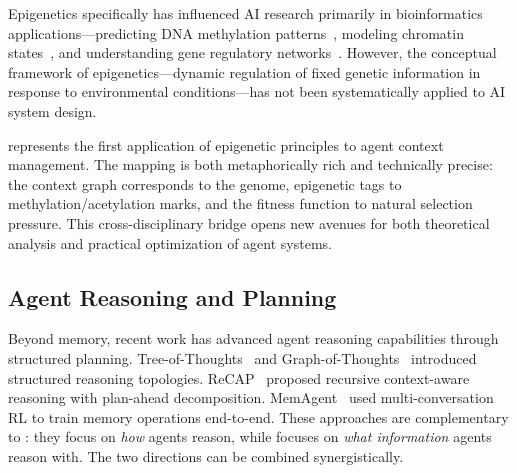 Epigenetics specifically has influenced AI research primarily in bioinformatics applications---predicting DNA methylation patterns~\citep{angermueller2017deepcpg}, modeling chromatin states~\citep{linder2025predicting}, and understanding gene regulatory networks~\citep{gao2024epigept}. However, the conceptual framework of epigenetics---dynamic regulation of fixed genetic information in response to environmental conditions---has not been systematically applied to AI system design.

\EpiContext{} represents the first application of epigenetic principles to agent context management. The mapping is both metaphorically rich and technically precise: the context graph corresponds to the genome, epigenetic tags to methylation/acetylation marks, and the fitness function to natural selection pressure. This cross-disciplinary bridge opens new avenues for both theoretical analysis and practical optimization of agent systems.

\subsection{Agent Reasoning and Planning}

Beyond memory, recent work has advanced agent reasoning capabilities through structured planning. Tree-of-Thoughts~\citep{yao2023tree} and Graph-of-Thoughts~\citep{besta2024graph} introduced structured reasoning topologies. ReCAP~\citep{recap2025neurips} proposed recursive context-aware reasoning with plan-ahead decomposition. MemAgent~\citep{yu2026memagent} used multi-conversation RL to train memory operations end-to-end. These approaches are complementary to \EpiContext: they focus on \textit{how} agents reason, while \EpiContext{} focuses on \textit{what information} agents reason with. The two directions can be combined synergistically.